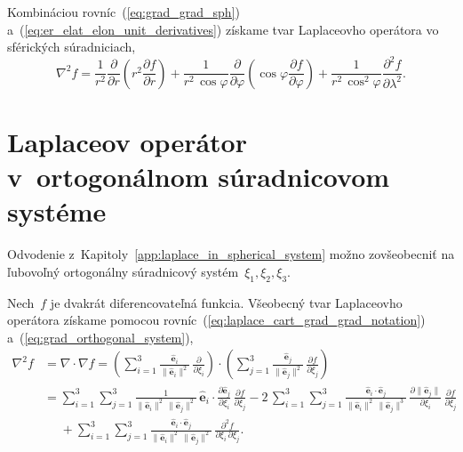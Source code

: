 \documentclass[a4paper, 12pt]{book}
\let\vec\mathbf
\begin{document}
%
Kombináciou rovníc~(\ref{eq:grad_grad_sph}) 
a~(\ref{eq:er_elat_elon_unit_derivatives}) získame tvar Laplaceovho operátora 
vo sférických súradniciach,
%
\begin{equation}
\label{eq:laplace_sph}
\nabla^2 f = \frac{1}{r^2} \frac{\partial}{\partial r} \left( r^2
\frac{\partial f}{\partial r} \right) + \frac{1}{r^2 \, \cos\varphi}
\frac{\partial}{\partial \varphi} \left( \cos\varphi \frac{\partial f}{\partial 
\varphi} \right) + \frac{1}{r^2 \,
\cos^2\varphi}\frac{\partial^2 f}{\partial \lambda^2}{.}
\end{equation}




\section{Laplaceov operátor v~ortogonálnom súradnicovom systéme}
\label{app:laplace_in_orthogonal_coordinates}

Odvodenie z~Kapitoly~\ref{app:laplace_in_spherical_system} možno zovšeobecniť 
na ľubovoľný ortogonálny súradnicový systém~$\xi_1, \xi_2, \xi_3$.

Nech~$f$ je dvakrát diferencovateľná funkcia.  Všeobecný tvar Laplaceovho 
operátora získame pomocou rovníc~(\ref{eq:laplace_cart_grad_grad_notation}) 
a~(\ref{eq:grad_orthogonal_system}),
%
\begin{equation}
\label{eq:laplace_orthogonal_system_1}
\begin{split}
\nabla^2 f &= \nabla \cdot \nabla f = \left( \sum_{i = 1}^3 \frac{\hat{\vec 
e}_i}{\| \hat{\vec e}_i \|^2} \, \frac{\partial}{\partial \xi_i}\right) \cdot 
\left( \sum_{j = 1}^3 \frac{\hat{\vec e}_j}{\| \hat{\vec e}_j \|^2} \, 
\frac{\partial f}{\partial \xi_j}
\right)\\
%
&= \sum_{i = 1}^{3} \sum_{j = 1}^3 \frac{1}{\| \hat{\vec e}_i \|^2 \, \| 
\hat{\vec e}_j \|^2} \, \hat{\vec e}_i \cdot \frac{\partial \hat{\vec 
e}_j}{\partial \xi_i} \, \frac{\partial f}{\partial \xi_j}
- 2\, \sum_{i = 1}^{3} \sum_{j = 1}^3 \frac{\hat{\vec e}_i \cdot \hat{\vec 
e}_j}{\| \hat{\vec e}_i \|^2 \, \|\hat{\vec e}_j \|^3} \, \frac{\partial \| 
\hat{\vec e}_j \|}{\partial \xi_i} \, \frac{\partial f}{\partial \xi_j}\\
%
&\phantom{={}}+ \sum_{i = 1}^{3} \sum_{j = 1}^3 \frac{\hat{\vec e}_i \cdot 
\hat{\vec e}_j}{\| \hat{\vec e}_i \|^2 \, \| \hat{\vec e}_j \|^2} \, 
\frac{\partial^2 f}{\partial \xi_i \, \partial \xi_j}{.}
\end{split}
%
\end{equation}
\end{document}
